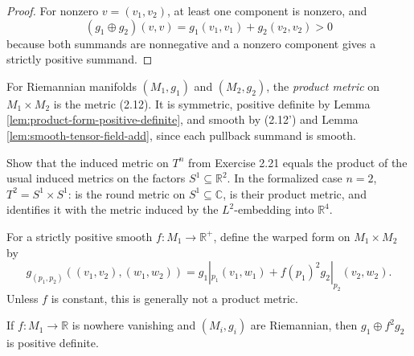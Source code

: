 \begin{proof}
\leanok
{}
\sketch For nonzero $v=(v_1,v_2)$, at least one component is nonzero, and
\[
(g_1\oplus g_2)(v,v)=g_1(v_1,v_1)+g_2(v_2,v_2)>0
\]
because both summands are nonnegative and a nonzero component gives a strictly positive summand.
\end{proof}

\begin{definition}
\label{def:product-metric}
\leanok
{}
For Riemannian manifolds $(M_1,g_1)$ and $(M_2,g_2)$, the \emph{product metric} on $M_1\times M_2$ is the metric (2.12). It is symmetric, positive definite by Lemma \ref{lem:product-form-positive-definite}, and smooth by (2.12') and Lemma \ref{lem:smooth-tensor-field-add}, since each pullback summand is smooth.
\end{definition}

\begin{exercise}
\label{exer:product-metric-torus}
\leanok
{}
Show that the induced metric on $T^n$ from Exercise 2.21 equals the product of the usual induced metrics on the factors $S^1\subseteq\mathbb R^2$. In the formalized case $n=2$, $T^2=S^1\times S^1$:  is the round metric on $S^1\subseteq\mathbb C$,  is their product metric, and  identifies it with the metric induced by the $L^2$-embedding into $\mathbb R^4$.
\end{exercise}

For a strictly positive smooth $f:M_1\to\mathbb R^+$, define the warped form on $M_1\times M_2$ by
\begin{equation}
g_{(p_1,p_2)}((v_1,v_2),(w_1,w_2))=g_1|_{p_1}(v_1,w_1)+f(p_1)^2g_2|_{p_2}(v_2,w_2).
\end{equation}
Unless $f$ is constant, this is generally not a product metric.

\begin{lemma}
\label{lem:warped-product-form-positive-definite}
\leanok
{}
If $f:M_1\to\mathbb R$ is nowhere vanishing and $(M_i,g_i)$ are Riemannian, then $g_1\oplus f^2g_2$ is positive definite.
\end{lemma}

